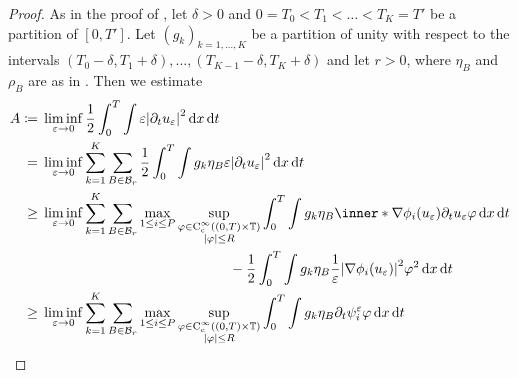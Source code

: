 \begin{proof}
	As in the proof of , let $ \delta > 0 $ 
	and $ 0 = T_{ 0 } < T_{ 1 } < \dotsc < T_{ K } = T' $ be a partition of $ [ 
	0 , T' ] $. Let $ ( g_{ k } )_{ k = 1 , \dotsc , K } $ be a partition of 
	unity with respect to the intervals $ ( T_{ 0 } - \delta , T_{ 1 } + \delta 
	), \dotsc , ( T_{ K - 1 } - \delta , T_{ K } + \delta ) $ and let $ r > 0 
	$, where $ \eta_{ B } $ and $ \rho_{ B } $ are as in 
	. Then we estimate
	\begin{align*}
		 A \coloneqq{}& \liminf_{ \varepsilon \to 0 }
			\frac{ 1 }{ 2 }
			\int_{ 0 }^{ T }
				\int
					\varepsilon
					\abs{ \partial_{ t } u_{ \varepsilon } }^{ 2 }
				\dd{ x }
			\dd{ t }
		\\
		={} &
		\liminf_{ \varepsilon \to 0 }
			\sum_{ k = 1 }^{ K }
				\sum_{ B \in \mathcal{ B }_{ r } } 
					\frac{ 1 }{ 2 }
					\int_{ 0 }^{ T }
						\int
							g_{ k } \eta_{ B }
							\varepsilon
							\abs{ \partial_{ t } u_{ \varepsilon } }^{ 2 }
						\dd{ x }
					\dd{ t }
		\\
		\geq{} &
		\liminf_{ \varepsilon \to 0 }
			\sum_{ k = 1 }^{ K }
				\sum_{ B \in \mathcal{ B }_{ r } }
					\max_{ 1 \leq i \leq P }
						\sup_{ 
							\substack{ 
								\varphi \in \cont_{ \mathrm{c} }^{ \infty } 
								\left( ( 0 , T ) \times \flattorus \right)
								\\
								\abs{ \varphi } \leq R  
							}
						}
							\int_{ 0 }^{ T }
								\int
									g_{ k } \eta_{ B }
									\inner*{ \nabla \phi_{ i } ( u_{ 
									\varepsilon 
									} ) }{ \partial_{ t } u_{ \varepsilon } }
									\varphi
								\dd{ x }
							\dd{ t } 
		\\
							& \qquad \qquad \qquad \qquad \qquad \qquad \quad 
							\:\, -
							\frac{ 1 }{ 2 }
							\int_{ 0 }^{ T }
								\int
									g_{ k } \eta_{ B }
									\frac{ 1 }{ \varepsilon }
									\abs{ \nabla \phi_{ i } ( u_{ \varepsilon } 
									) }^{ 2 }
									\varphi^{ 2 }
								\dd{ x }
							\dd{ t }
		\\
		\geq{} &
		\liminf_{ \varepsilon \to 0 }
		\sum_{ k = 1 }^{ K }
		\sum_{ B \in \mathcal{ B }_{ r } }
		\max_{ 1 \leq i \leq P }
		\sup_{ 
			\substack{ 
				\varphi \in \cont_{ \mathrm{c} }^{ \infty } 
				\left( ( 0 , T ) \times \flattorus \right)
				\\
				\abs{ \varphi } \leq R  
			}
		}
		\int_{ 0 }^{ T }
		\int
		g_{ k } \eta_{ B }
		\partial_{ t } \psi_{ i }^{ \varepsilon }
		\varphi
		\dd{ x }
		\dd{ t } 

\end{align*}
\end{proof}
